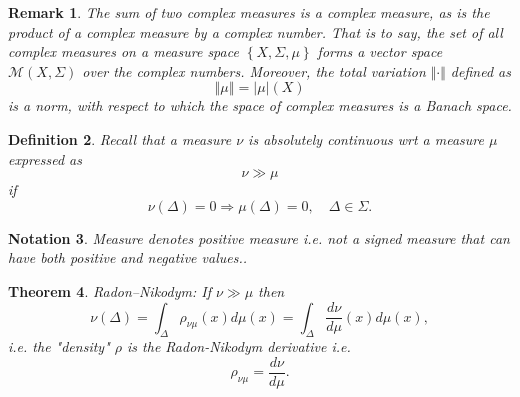 \documentclass[aps,preprint]{revtex4}%
\providecommand{\U}[1]{\protect\rule{.1in}{.1in}}
\newtheorem{theorem}{Theorem}
\newtheorem{definition}[theorem]{Definition}
\newtheorem{notation}[theorem]{Notation}
\newtheorem{remark}[theorem]{Remark}
\begin{document}
\begin{remark}
The sum of two complex measures is a complex measure, as is the product of a
complex measure by a complex number. That is to say, the set of all complex
measures on a measure space $\left\{  X,\Sigma,%
\mu
\right\}  $ forms a \emph{vector space} $\mathcal{M}\left(  X,\Sigma\right)  $
over the complex numbers. Moreover, the \emph{total variation} $\Vert
\cdot\Vert$ defined as%
\begin{equation}
\left\Vert
\mu
\right\Vert =\left\vert
\mu
\right\vert \left(  X\right)
\end{equation}
is a norm, with respect to which the space of complex measures is a Banach space.
\end{remark}

\begin{definition}
Recall that a \emph{measure} $\nu$ is absolutely continuous wrt a measure
$\mu$ expressed as
\begin{equation}
\nu\gg\mu
\end{equation}
if
\begin{equation}
\nu\left(  \Delta\right)  =0\Rightarrow\mu\left(  \Delta\right)
=0,\quad\Delta\in\Sigma.
\end{equation}

\end{definition}

\begin{notation}
Measure denotes positive measure i.e. not a \emph{signed} measure that can
have both positive and negative values..
\end{notation}

\begin{theorem}
\emph{Radon--Nikodym}: If $\nu\gg\mu$ then
\begin{equation}
\nu\left(  \Delta\right)  =\int_{\Delta}\rho_{\nu\mu}\left(  x\right)  d%
\mu
\left(  x\right)  =\int_{\Delta}\frac{d\nu}{d%
\mu
}\left(  x\right)  d%
\mu
\left(  x\right)  ,
\end{equation}
i.e. the "density" $\rho$ is the \emph{Radon-Nikodym derivative} i.e.
\begin{equation}
\rho_{\nu\mu}=\frac{d\nu}{d%
\mu
}.
\end{equation}

\end{theorem}
\end{document}
